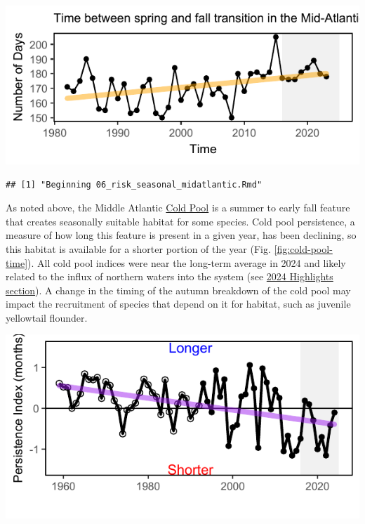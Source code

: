 \documentclass[
  10pt,
]{article}
\let\origfigure\figure
\let\endorigfigure\endfigure
\renewenvironment{figure}[1][2] {
    \expandafter\origfigure\expandafter[H]
} {
    \endorigfigure
}
\begin{document}
\begin{figure}

{\centering \includegraphics{midatlantic_files/figure-latex/transition-1} 

}

\caption{Ocean summer length in the MAB: the annual total number of days between the spring thermal transition date and the fall thermal transition date (black), with an increasing trend (orange).}\label{fig:transition}
\end{figure}

\begin{verbatim}
## [1] "Beginning 06_risk_seasonal_midatlantic.Rmd"
\end{verbatim}

As noted above, the Middle Atlantic \href{https://noaa-edab.github.io/catalog/cold_pool.html}{Cold Pool} is a summer to early fall feature that creates seasonally suitable habitat for some species. Cold pool persistence, a measure of how long this feature is present in a given year, has been declining, so this habitat is available for a shorter portion of the year (Fig. \ref{fig:cold-pool-time}). All cold pool indices were near the long-term average in 2024 and likely related to the influx of northern waters into the system (see \hyperref[highlights]{2024 Highlights section}). A change in the timing of the autumn breakdown of the cold pool may impact the recruitment of species that depend on it for habitat, such as juvenile yellowtail flounder.

\begin{figure}

{\centering \includegraphics{midatlantic_files/figure-latex/cold-pool-time-1} 

}

\caption{Cold pool persistence index based on bias-corrected ROMS-NWA (open circles) and GLORYS (closed circles).}\label{fig:cold-pool-time}
\end{figure}
\end{document}
